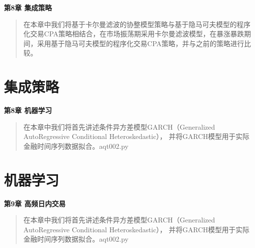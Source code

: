 \documentclass{article}
\begin{document}
\maketitle\begin{center}
\Large \textbf{第8章 集成策略}
\end{center}
\begin{abstract}
在本章中我们将基于卡尔曼滤波的协整模型策略与基于隐马可夫模型的程序化交易CPA策略相结合，在市场振荡期采用卡尔曼滤波模型，在暴涨暴跌期间，采用基于隐马可夫模型的程序化交易CPA策略，并与之前的策略进行比较。
\end{abstract}
\section{集成策略}


























\maketitle\begin{center}
\Large \textbf{第8章 机器学习}
\end{center}
\begin{abstract}
在本章中我们将首先讲述条件异方差模型GARCH（Generalized AutoRegressive Conditional Heteroskedastic），
并将GARCH模型用于实际金融时间序列数据拟合。aqt002.py
\end{abstract}
\section{机器学习}

\maketitle\begin{center}
\Large \textbf{第9章 高频日内交易}
\end{center}
\begin{abstract}
在本章中我们将首先讲述条件异方差模型GARCH（Generalized AutoRegressive Conditional Heteroskedastic），
并将GARCH模型用于实际金融时间序列数据拟合。aqt002.py
\end{abstract}
\end{document}
